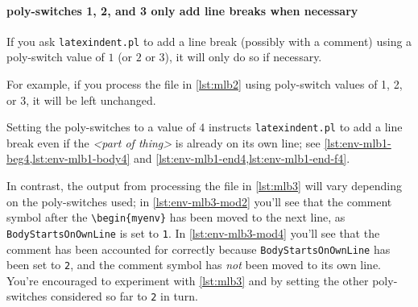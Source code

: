 \documentclass[10pt]{article}
\begin{document}
 \paragraph{poly-switches 1, 2, and 3 only add line breaks when necessary}
  If you ask \texttt{latexindent.pl} to add a line break (possibly with a comment) using
  a poly-switch value of $1$ (or $2$ or $3$), it will only do so if necessary.

  \begin{example}
  For example, if you process the file in \vref{lst:mlb2} using poly-switch values of 1,
  2, or 3, it will be left unchanged.

  \begin{cmhtcbraster}
  \end{cmhtcbraster}
  \end{example}

  Setting the poly-switches to a value of $4$ instructs \texttt{latexindent.pl} to add a
  line break even if the \emph{<part of thing>} is already on its own line; see
  \cref{lst:env-mlb1-beg4,lst:env-mlb1-body4} and
  \cref{lst:env-mlb1-end4,lst:env-mlb1-end-f4}.

  \begin{example}
  In contrast, the output from processing the file in \cref{lst:mlb3} will vary depending
  on the poly-switches used; in \cref{lst:env-mlb3-mod2} you'll see that the comment
  symbol after the \lstinline!\begin{myenv}! has been moved to the next line, as
  \texttt{BodyStartsOnOwnLine} is set to \texttt{1}. In \cref{lst:env-mlb3-mod4} you'll
  see that the comment has been accounted for correctly because
  \texttt{BodyStartsOnOwnLine} has been set to \texttt{2}, and the comment symbol has
  \emph{not} been moved to its own line. You're encouraged to experiment with
  \cref{lst:mlb3} and by setting the other poly-switches considered so far to \texttt{2}
  in turn.

  \begin{cmhtcbraster}[raster column skip=.1\linewidth]
  \end{cmhtcbraster}
  \end{example}
\end{document}
